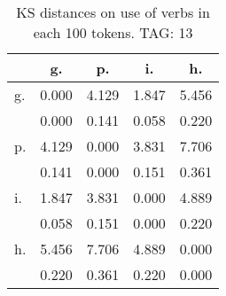 \begin{table}[h!]
\begin{center}
\begin{tabular}{| l | c | c | c | c |}\hline
 & g. & p. & i. & h. \\\hline
g. & 0.000  & 4.129  & 1.847  & 5.456 \\\hline
 & 0.000  & 0.141  & 0.058  & 0.220 \\\hline
p. & 4.129  & 0.000  & 3.831  & 7.706 \\\hline
 & 0.141  & 0.000  & 0.151  & 0.361 \\\hline
i. & 1.847  & 3.831  & 0.000  & 4.889 \\\hline
 & 0.058  & 0.151  & 0.000  & 0.220 \\\hline
h. & 5.456  & 7.706  & 4.889  & 0.000 \\\hline
 & 0.220  & 0.361  & 0.220  & 0.000 \\\hline
\end{tabular}
\caption{KS distances on use of verbs in each 100 tokens. TAG: 13}
\end{center}
\end{table}